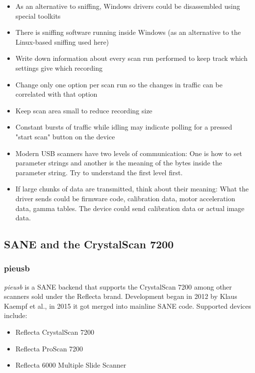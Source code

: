 \documentclass{article}
\begin{document}
\begin{itemize}
  \item As an alternative to sniffing, Windows drivers could be disassembled
        using special toolkits
  \item There is sniffing software running inside Windows (as an alternative to
        the Linux-based sniffing used here)
  \item Write down information about every scan run performed to keep track which
        settings give which recording
  \item Change only one option per scan run so the changes in traffic can be correlated
        with that option
  \item Keep scan area small to reduce recording size
  \item Constant bursts of traffic while idling may indicate polling for a pressed "start
        scan" button on the device
  \item Modern USB scanners have two levels of communication: One is how to set parameter
        strings and another is the meaning of the bytes inside the parameter string.
        Try to understand the first level first.
  \item If large chunks of data are transmitted, think about their meaning:
        What the driver sends could be firmware code, calibration data, 
        motor acceleration data, gamma tables. The device could send calibration data or actual image data.
\end{itemize}

\subsection{SANE and the CrystalScan 7200}

\subsubsection{pieusb}

{\it pieusb} is a SANE backend that supports the CrystalScan 7200 among
other scanners sold under the Reflecta brand. Development began
in 2012 by Klaus Kaempf et al., in 2015 it got merged into mainline SANE code.
Supported devices include:

\begin{itemize}
  \item Reflecta CrystalScan 7200
  \item Reflecta ProScan 7200
  \item Reflecta 6000 Multiple Slide Scanner
\end{itemize}
\end{document}
